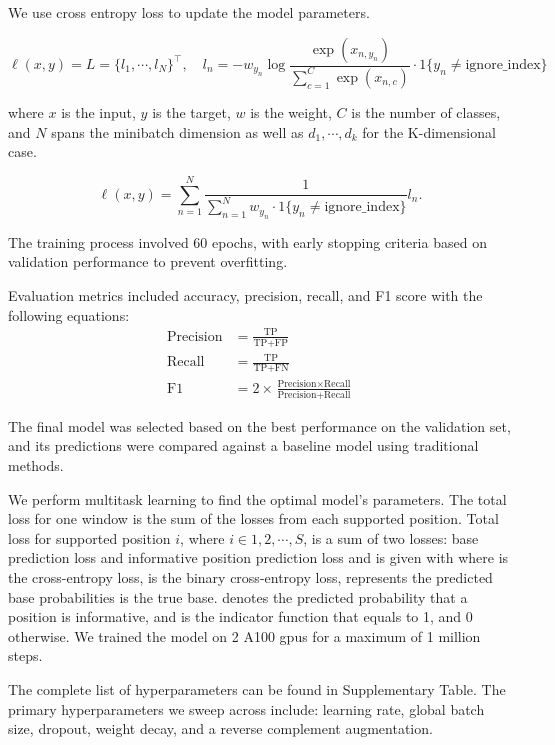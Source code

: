 \documentclass[pdflatex, sn-mathphys-num, lineno]{sn-jnl}%
\theoremstyle{thmstyleone}%
\theoremstyle{thmstyletwo}%
\theoremstyle{thmstylethree}%
\begin{document}
We use cross entropy loss to update the model parameters.

\[
	\ell(x, y) = L = \{l_1,\cdots,l_N\}^\top, \quad
	l_n = - w_{y_n} \log \frac{\exp(x_{n,y_n})}{\sum_{c=1}^C \exp(x_{n,c})}
	\cdot 1\{y_n \not= \textrm{ignore\_index}\}
\]

where \( x \) is the input, \( y \) is the target, \( w \) is the weight,
\( C \) is the number of classes, and \( N \) spans the minibatch dimension as well as
\( d_1, \cdots, d_k \) for the K-dimensional case.

\[
	\ell(x, y) =   \sum_{n=1}^N \frac{1}{\sum_{n=1}^N w_{y_n} \cdot 1\{y_n \not= \textrm{ignore\_index}\}} l_n
	.\]

The training process involved \num{60} epochs, with early stopping criteria based on validation performance to prevent overfitting.

Evaluation metrics included accuracy, precision, recall, and F1 score with the following equations:
\begin{align*}
	\textrm{Precision} & = \frac{\textrm{TP}}{\textrm{TP}+\textrm{FP}}                                                     \\
	\textrm{Recall}    & = \frac{\textrm{TP}}{\textrm{TP}+\textrm{FN}}                                                     \\
	\textrm{F1}        & = 2 \times \frac{\textrm{Precision} \times \textrm{Recall}}{\textrm{Precision} + \textrm{Recall}}
\end{align*}

The final model was selected based on the best performance on the validation set, and its predictions were compared against a baseline model using traditional methods.

We perform multitask learning to find the optimal model's parameters.
The total loss for one window is the sum of the losses from each supported position.
Total loss for supported position  \( i \), where \( i  \in {1,2, \cdots, S} \), is a sum of two losses: base prediction loss and informative position prediction loss and is given with
where is the cross-entropy loss, is the binary cross-entropy loss, represents the predicted base probabilities is the true base.
denotes the predicted probability that a
position is informative, and is the indicator function that equals to 1, and 0 otherwise.
We trained the model on 2 A100 \glspl{gpu} for a maximum of 1 million steps.

The complete list of hyperparameters can be found in Supplementary Table.
The primary hyperparameters we sweep across include: learning rate, global batch size, dropout, weight decay, and a reverse complement augmentation.
\end{document}
